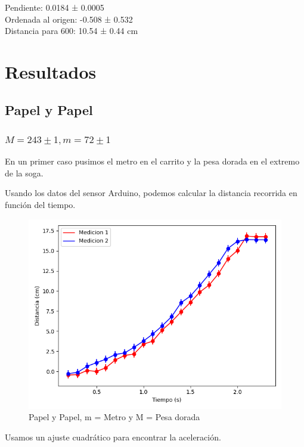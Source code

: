\documentclass[12pt,a4]{article}
\begin{document}
Pendiente: 0.0184 ± 0.0005 \\

Ordenada al origen: -0.508 ± 0.532 \\

Distancia para 600: 10.54 ± 0.44 cm \\

\section{Resultados}

\subsection{Papel y Papel}

\subsubsection{$M = 243 \pm 1, m = 72 \pm 1$}

En un primer caso pusimos el metro en el carrito y la pesa dorada en el extremo de la soga.

Usando los datos del sensor Arduino, podemos calcular la distancia recorrida en función del tiempo.

\begin{figure}[H]
    \centering
    \includegraphics[width=0.9\linewidth]{TiempoVsDistanciaPapelPapelM_O.png}
    \caption{Papel y Papel, m = Metro y M = Pesa dorada}
    \label{fig:PyPM_O}
\end{figure}

Usamos un ajuste cuadrático para encontrar la aceleración.
\end{document}

